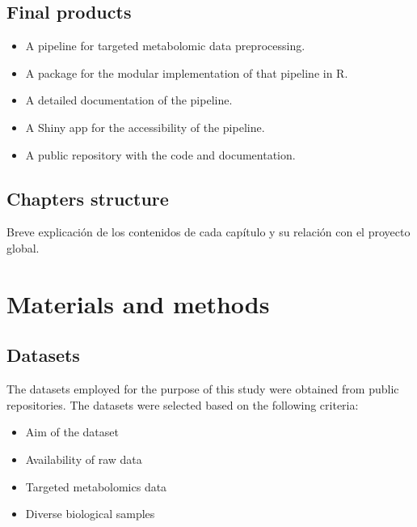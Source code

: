 \documentclass[ENG, BIB]{TFUOC}%
\begin{document}
\section{Final products} 
\begin{itemize}
    \item A pipeline for targeted metabolomic data preprocessing.
    \item A package for the modular implementation of that pipeline in R.
    \item A detailed documentation of the pipeline.
    \item A Shiny app for the accessibility of the pipeline.
    \item A public repository with the code and documentation.
\end{itemize}

\section{Chapters structure} 
Breve explicación de los contenidos de cada capítulo y su relación con el proyecto global.



\chapter{Materials and methods}

\section{Datasets} 
The datasets employed for the purpose of this study were obtained from public repositories.
The datasets were selected based on the following criteria:
\begin{itemize}
    \item Aim of the dataset
    \item Availability of raw data
    \item Targeted metabolomics data
    \item Diverse biological samples
\end{itemize}
\end{document}
